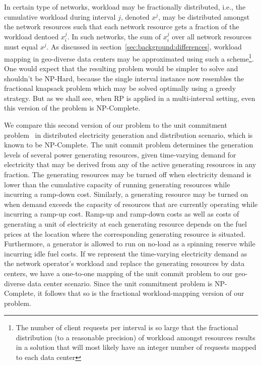 In certain type of networks, workload may be fractionally distributed, i.e., the cumulative workload during interval $j$, denoted $x^j$, may be distributed amongst the network resources such that each network resource gets a fraction of the workload dentoed $x_i^j$. In such networks, the sum of $x_i^j$ over all network resources must equal $x^j$. As discussed in section~\ref{sec:background:differences}, workload mapping in geo-diverse data centers may be approximated using such a scheme\footnote{The number of client requests per interval is so large that the fractional distribution (to a reasonable precision) of workload amongst resources results in a solution that will most likely have an integer number of requests mapped to each data center}. One would expect that the resulting problem would be simpler to solve and shouldn't be NP-Hard, because the single interval instance now resembles the fractional knapsack problem which may be solved optimally using a greedy strategy. But as we shall see, when RP is applied in a multi-interval setting, even this version of the problem is NP-Complete.

We compare this second version of our problem to the unit commitment problem~\cite{unitcommit-trans} in distributed electricity generation and distribution scenario, which is known to be NP-Complete. The unit commit problem determines the generation levels of several power generating resources, given time-varying demand for electricity that may be derived from any of the active generating resources in any fraction. The generating resources may be turned off when electricity demand is lower than the cumulative capacity of running generating resources while incurring a ramp-down cost. Similarly, a generating resource may be turned on when demand exceeds the capacity of resources that are currently operating while incurring a ramp-up cost. Ramp-up and ramp-down costs as well as costs of generating a unit of electricity at each generating resource depends on the fuel prices at the location where the corresponding generating resource is situated. Furthermore, a generator is allowed to run on no-load as a spinning reserve while incurring idle fuel costs. If we represent the time-varying electricity demand as the network operator's workload and replace the generating resources by data centers, we have a one-to-one mapping of the unit commit problem to our geo-diverse data center scenario. Since the unit commitment problem is NP-Complete, it follows that so is the fractional workload-mapping version of our problem.

